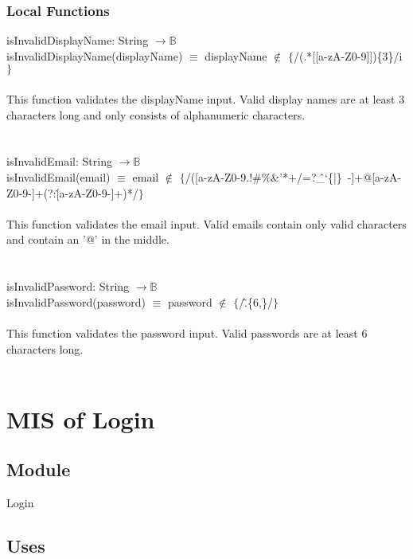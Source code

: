 \documentclass[12pt, titlepage]{article}
\begin{document}
\subsubsection{Local Functions}
isInvalidDisplayName: String $\rightarrow \mathbb{B}$  \\
isInvalidDisplayName(displayName) $\equiv$ displayName $\notin$ $\{$/(.*[[a-zA-Z0-9]])\{3\}/i$\}$ 
\\ \\
This function validates the displayName input. Valid display names are at least 3 characters long and only consists of alphanumeric characters. \\ 
\\ 
\\
isInvalidEmail: String $\rightarrow \mathbb{B}$  \\
isInvalidEmail(email) $\equiv$ email $\notin$ $\{$/([a-zA-Z0-9.!\#\%\&'*+/=?\^\_`\{|\}~-]+@[a-zA-Z0-9-]+(?:\.[a-zA-Z0-9-]+)*/$\}$ 
\\ \\
This function validates the email input. Valid emails contain only valid characters and contain an '@' in the middle. \\
\\
\\
isInvalidPassword: String $\rightarrow \mathbb{B}$  \\
isInvalidPassword(password) $\equiv$ password $\notin$ $\{$/\^.\{6,\}/$\}$ 
\\ \\
This function validates the password input. Valid passwords are at least 6 characters long.  
\\ \\


\medskip
\newpage
\section{MIS of Login} \label{Login} 

\subsection{Module}

Login

\subsection{Uses}
\end{document}
